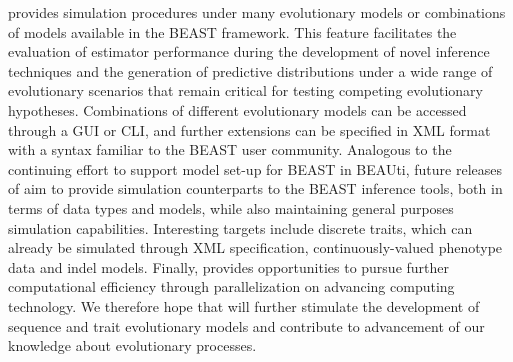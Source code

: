 {\bussname} provides simulation procedures under many evolutionary models or combinations of models available in the BEAST framework.  
This feature facilitates the evaluation of estimator performance during the development of novel inference techniques and the generation of predictive distributions under a wide range of evolutionary scenarios that remain critical for testing competing evolutionary hypotheses.
Combinations of different evolutionary models can be accessed through a GUI or CLI, and further extensions can be specified in XML format with a syntax familiar to the BEAST user community.
Analogous to the continuing effort to support model set-up for BEAST in BEAUti, future releases of {\bussname} aim to provide simulation counterparts to the BEAST inference tools, both in terms of data types and models, while also maintaining general purposes simulation capabilities.
Interesting targets include discrete traits, which can already be simulated through XML specification, continuously-valued phenotype data \cite{Lemey2010} and indel models.
Finally, {\bussname} provides opportunities to pursue further computational efficiency through parallelization on advancing computing technology.
We therefore hope that {\bussname} will further stimulate the development of sequence and trait evolutionary models and contribute to advancement of our knowledge about evolutionary processes.




